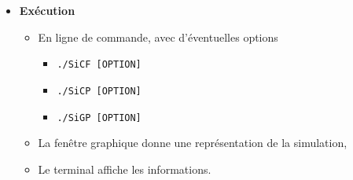 \begin{itemize}[leftmargin=1cm, label=, itemsep=0pt]
\item {\bf Exécution}
	\begin{itemize}[leftmargin=1cm, label=, itemsep=0pt]
	\item En ligne de commande, avec d'éventuelles options
		\begin{itemize}[leftmargin=1cm, label=, itemsep=0pt]
		\item \texttt{./SiCF [OPTION]}
		\item \texttt{./SiCP [OPTION]}
		\item \texttt{./SiGP [OPTION]}
		\end{itemize}
	\item La fenêtre graphique donne une représentation de la simulation,
	\item Le terminal affiche les informations.
	\end{itemize}
\end{itemize}




